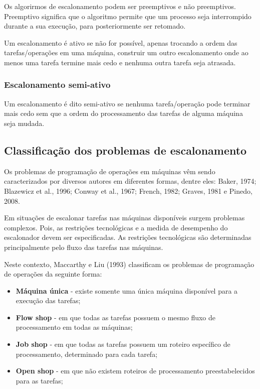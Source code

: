 Os algorirmos de escalonamento podem ser preemptivos e não preemptivos. Preemptivo significa que o algoritmo permite que um processo seja interrompido durante a sua execução, para posteriormente ser retomado.

Um escalonamento é ativo se não for possível, apenas trocando a ordem das tarefas/operações em uma máquina, construir um outro escalonamento onde ao menos uma tarefa termine mais cedo e nenhuma outra tarefa seja atrasada.

\subsubsection{Escalonamento semi-ativo}

Um escalonamento é dito semi-ativo se nenhuma tarefa/operação pode terminar mais cedo sem que a ordem do processamento das tarefas de alguma máquina seja mudada.

\subsection{Classificação dos problemas de escalonamento}
Os problemas de programação de operações em máquinas vêm sendo caracterizados por diversos autores em diferentes formas, dentre eles: Baker, 1974; Blazewicz et al., 1996; Conway et al., 1967; French, 1982; Graves, 1981 e Pinedo, 2008.

Em situações de escalonar tarefas nas máquinas disponíveis surgem problemas complexos. Pois, as restrições tecnológicas e a medida de desempenho do escalonador devem ser especificadas. As restrições tecnológicas são determinadas principalmente pelo fluxo das tarefas nas máquinas.

Neste contexto, Maccarthy e Liu (1993) classificam os problemas de programação de operações da seguinte forma:
 
\begin{itemize}
\item \textbf{Máquina única} - existe somente uma única máquina disponível para a execução das tarefas;
\item \textbf{Flow shop} - em que todas as tarefas possuem o mesmo fluxo de processamento em todas as máquinas;
 \item \textbf{Job shop} - em que todas as tarefas possuem um roteiro específico de processamento, determinado para cada tarefa;
 \item \textbf{Open shop} - em que não existem roteiros de processamento preestabelecidos para as tarefas;
 \end{itemize}

